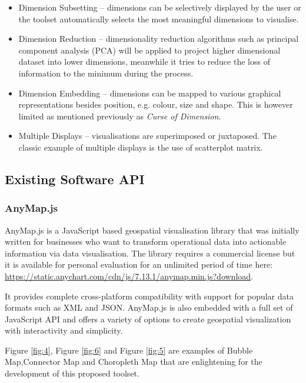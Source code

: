 \documentclass[11pt,a4paper]{article}
\begin{document}
\begin{itemize}
	\item Dimension Subsetting -- dimensions can be selectively displayed by the user or the toolset automatically selects the most meaningful dimensions to visualise.
	\item Dimension Reduction -- dimensionality reduction algorithms such as principal component analysis (PCA) will be applied to project higher dimensional dataset into lower dimensions, meanwhile it tries to reduce the loss of information to the minimum during the process.
	\item Dimension Embedding -- dimensions can be mapped to various graphical representations besides position, e.g. colour, size and shape. This is however limited as mentioned previously as \textit{Curse of Dimension}.
	\item Multiple Displays -- visualisations are superimposed or juxtaposed. The classic example of multiple displays is the use of scatterplot matrix.
\end{itemize}

\subsection{Existing Software API}
\subsubsection{AnyMap.js}
AnyMap.js is a JavaScript based geospatial visualisation library that was initially written for businesses who want to transform operational data into actionable information via data visualisation. The library requires a commercial license but it is available for personal evaluation for an unlimited period of time here: \url{https://static.anychart.com/cdn/js/7.13.1/anymap.min.js?download}. 

It provides complete cross-platform compatibility with support for popular data formats such as XML and JSON. AnyMap.js is also embedded with a full set of JavaScript API and offers a variety of options to create geospatial visualization with interactivity and simplicity.

Figure \ref{fig:4}, Figure \ref{fig:6} and Figure \ref{fig:5} are examples of Bubble Map,Connector Map and Choropleth Map that are enlightening for the development of this proposed toolset.
\end{document}
